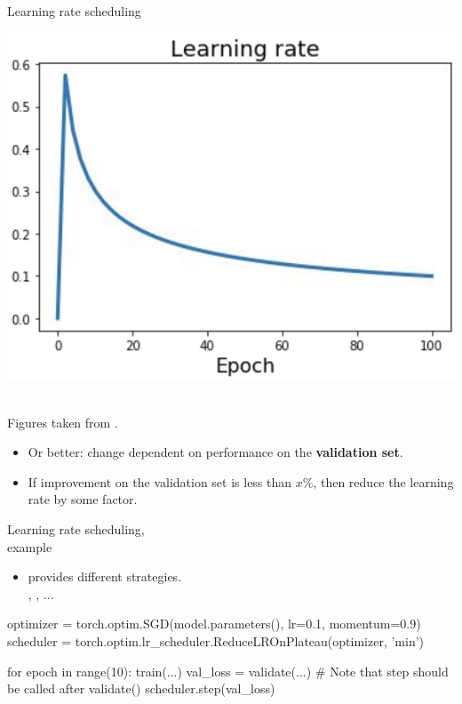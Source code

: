 \begin{frame}{Learning rate scheduling}
\begin{minipage}{0.3\linewidth}
\end{minipage}
\begin{minipage}{0.3\linewidth}
  \begin{center}
    \includegraphics[height=0.35\textheight]{figures/lr-schedule-3.png}
  \end{center}
\end{minipage}\\
\vspace{5mm}
{\scriptsize Figures taken from .}

\begin{itemize}
\item Or better: change dependent on performance on the \textbf{validation set}.
\item If improvement on the validation set is less than $x$\%, then reduce the learning rate by some factor.
\end{itemize}
\end{frame}

\begin{frame}[fragile]{Learning rate scheduling,\\example}
\begin{itemize}
\item {} provides different strategies.\\
, , ...
\end{itemize}
\begin{python}
optimizer = torch.optim.SGD(model.parameters(), lr=0.1, momentum=0.9)
scheduler =
    torch.optim.lr_scheduler.ReduceLROnPlateau(optimizer, 'min')

for epoch in range(10):
     train(...)
     val_loss = validate(...)
     # Note that step should be called after validate()
     scheduler.step(val_loss)
\end{python}
\end{frame}

